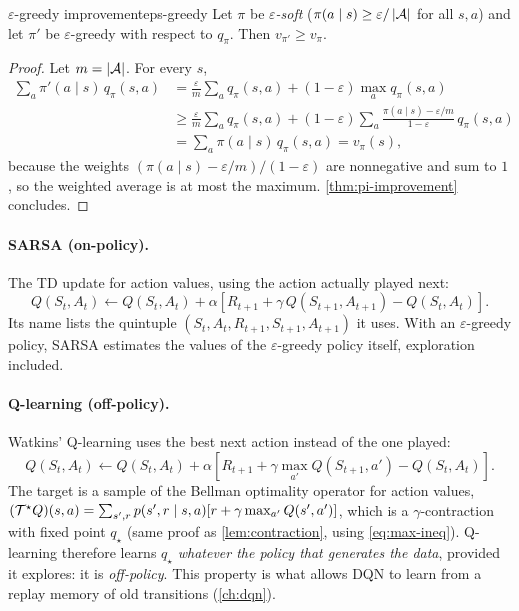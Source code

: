 \begin{proposition}{$\varepsilon$-greedy improvement}{eps-greedy}
  Let $\pi$ be \emph{$\varepsilon$-soft} ($\pi(a \mid s) \geq \varepsilon /
  \left\lvert \mathcal{A} \right\rvert$ for all $s, a$) and let $\pi'$ be $\varepsilon$-greedy
  with respect to $q_\pi$. Then $v_{\pi'} \geq v_\pi$.
\end{proposition}

\begin{proof}
  Let $m = \left\lvert \mathcal{A} \right\rvert$. For every $s$,
  \begin{align*}
    \sum_a \pi'(a \mid s)\, q_\pi(s, a)
    &= \frac{\varepsilon}{m} \sum_a q_\pi(s, a)
      + (1 - \varepsilon) \max_a q_\pi(s, a) \\
    &\geq \frac{\varepsilon}{m} \sum_a q_\pi(s, a) + (1 - \varepsilon)
      \sum_a \frac{\pi(a \mid s) - \varepsilon / m}{1 - \varepsilon}\,
      q_\pi(s, a) \\
    &= \sum_a \pi(a \mid s)\, q_\pi(s, a) = v_\pi(s),
  \end{align*}
  because the weights $(\pi(a \mid s) - \varepsilon / m) / (1 -
  \varepsilon)$ are nonnegative and sum to $1$, so the weighted average is
  at most the maximum. \cref{thm:pi-improvement} concludes.
\end{proof}

\paragraph{SARSA (on-policy).} The TD update for action values, using the
action actually played next:
\begin{equation}
  Q(S_t, A_t) \gets Q(S_t, A_t) + \alpha \left[ R_{t+1} + \gamma\,
  Q(S_{t+1}, A_{t+1}) - Q(S_t, A_t) \right].
\end{equation}
Its name lists the quintuple $(S_t, A_t, R_{t+1}, S_{t+1}, A_{t+1})$ it
uses. With an $\varepsilon$-greedy policy, SARSA estimates the values of
the $\varepsilon$-greedy policy itself, exploration included.

\paragraph{Q-learning (off-policy).} Watkins' Q-learning uses the best next
action instead of the one played:
\begin{equation}
  \label{eq:q-learning}
  Q(S_t, A_t) \gets Q(S_t, A_t) + \alpha \left[ R_{t+1} + \gamma \max_{a'}
  Q(S_{t+1}, a') - Q(S_t, A_t) \right].
\end{equation}
The target is a sample of the Bellman optimality operator for action
values, $(\mathcal{T}^\star Q)(s, a) = \sum_{s', r} p(s', r \mid s, a) [r + \gamma
\max_{a'} Q(s', a')]$, which is a $\gamma$-contraction with fixed point
$q_\star$ (same proof as \cref{lem:contraction}, using
\eqref{eq:max-ineq}). Q-learning therefore learns $q_\star$ \emph{whatever
the policy that generates the data}, provided it explores: it is
\emph{off-policy}. This property is what allows DQN to learn from a replay
memory of old transitions (\cref{ch:dqn}).


